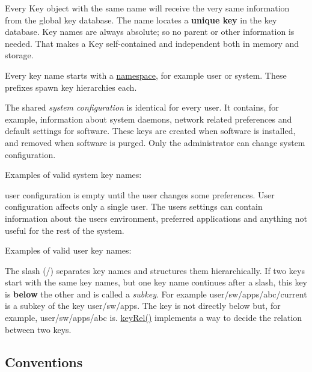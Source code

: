 Every {\ttfamily Key} object with the same name will receive the very same information from the global key database. The name locates a {\bfseries unique key} in the key database. Key names are always absolute; so no parent or other information is needed. That makes a {\ttfamily Key} self-\/contained and independent both in memory and storage.

Every key name starts with a \hyperlink{doc_help_elektra-namespaces_md}{namespace}, for example {\ttfamily user} or {\ttfamily system}. These prefixes spawn key hierarchies each.

The shared {\itshape system configuration} is identical for every user. It contains, for example, information about system daemons, network related preferences and default settings for software. These keys are created when software is installed, and removed when software is purged. Only the administrator can change system configuration.

Examples of valid system key names\+: 


user configuration is empty until the user changes some preferences. User configuration affects only a single user. The user\textquotesingle{}s settings can contain information about the user\textquotesingle{}s environment, preferred applications and anything not useful for the rest of the system.

Examples of valid user key names\+: 


The slash ({\ttfamily /}) separates key names and structures them hierarchically. If two keys start with the same key names, but one key name continues after a slash, this key is {\bfseries below} the other and is called a {\itshape subkey}. For example {\ttfamily user/sw/apps/abc/current} is a subkey of the key {\ttfamily user/sw/apps}. The key is not directly below but, for example, {\ttfamily user/sw/apps/abc} is. {\ttfamily \hyperlink{group__keytest_ga6bb0f95ac34ce9c42d61bb35a76139d0}{key\+Rel()}} implements a way to decide the relation between two keys.

\subsection*{Conventions}

